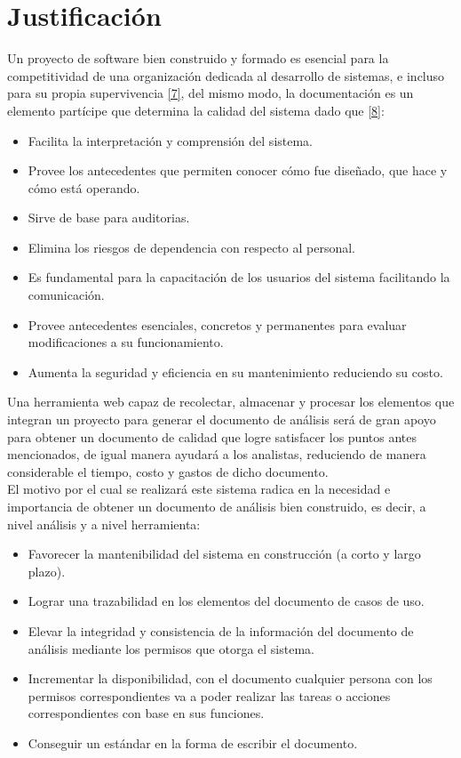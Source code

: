 
\section{Justificación}
Un proyecto de software bien construido y formado es esencial para la competitividad de una organización dedicada al desarrollo de sistemas, e incluso para su propia supervivencia \hyperlink{b07}{[7]}, del mismo modo, la documentación es un elemento partícipe que determina la calidad del sistema dado que \hyperlink{b08}{[8]}:

\begin{itemize}
	\item Facilita la interpretación y comprensión del sistema.
	\item Provee los antecedentes que permiten conocer cómo fue diseñado, que hace y cómo está operando.
	\item Sirve de base para auditorias.
	\item Elimina los riesgos de dependencia con respecto al personal.
	\item Es fundamental para la capacitación de los usuarios del sistema facilitando la comunicación.
	\item Provee antecedentes esenciales, concretos y permanentes para evaluar modificaciones a su funcionamiento.
	\item Aumenta la seguridad y eficiencia en su mantenimiento reduciendo su costo.
\end{itemize}

Una herramienta web capaz de recolectar, almacenar y procesar los elementos que integran un proyecto para generar el documento de análisis será de gran apoyo para obtener un documento de calidad que logre satisfacer los puntos antes mencionados, de igual manera ayudará a los analistas, reduciendo de manera considerable el tiempo, costo y gastos de dicho documento.\\

El motivo por el cual se realizará este sistema radica en la necesidad e importancia de obtener un documento de análisis bien construido, es decir, a nivel análisis y a nivel herramienta:

\begin{itemize}
\item Favorecer la mantenibilidad del sistema en construcción (a corto y largo plazo).
\item Lograr una trazabilidad en los elementos del documento de casos de uso.
\item Elevar la integridad y consistencia de la información del documento de análisis mediante los permisos que otorga el sistema.
\item Incrementar la disponibilidad, con el documento cualquier persona con los permisos correspondientes va a poder realizar las tareas o acciones correspondientes con base en sus funciones.
\item Conseguir un estándar en la forma de escribir el documento.
\end{itemize}


